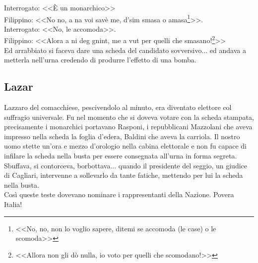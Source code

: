 \indent Interrogato: <<È un monarchico>>\\
\indent {}Filippino: <<No no, a na voi savè me, d'sim smasa o amasa\footnote{<<No, no, non lo voglio sapere, ditemi se accomoda (le case) o le scomoda>>}>>.\\
\indent Interrogato: <<No, le accomoda>>.\\
\indent {}Filippino: <<Alora a ni deg gnint, me a vut per quelli che smasano!\footnote{<<Allora non gli dò nulla, io voto per quelli che scomodano!>>}>>\\
\indent Ed arrabbiato si faceva dare una scheda del candidato sovversivo... ed andava a metterla nell'urna credendo di produrre l'effetto di una bomba.\\
\newpage
\subsection{Lazar}
Lazzaro del comacchiese, pescivendolo al minuto, era diventato elettore col suffragio universale. Fu nel momento che si doveva votare con la scheda stampata, precisamente i monarchici portavano Rasponi, i repubblicani Mazzolani che aveva impresso nella scheda la foglia d'edera, Baldini che aveva la carriola. Il nostro uomo stette un'ora e mezzo d'orologio nella cabina elettorale e non fu capace di infilare la scheda nella busta per essere consegnata all'urna in forma segreta. Sbuffava, si contorceva, borbottava... quando il presidente del seggio, un giudice di Cagliari, intervenne a sollevarlo da tante fatiche, mettendo per lui la scheda nella busta.\\
\indent Così queste teste dovevano nominare i rappresentanti della Nazione. Povera Italia!